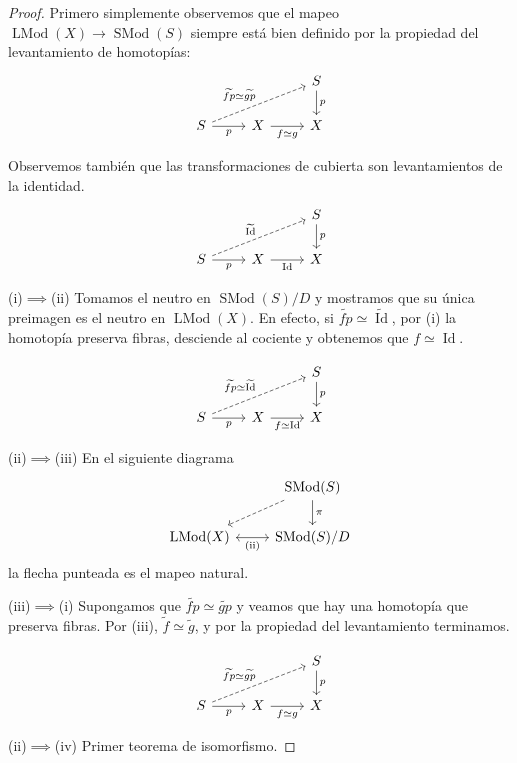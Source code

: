 \documentclass[spanish]{article}
\theoremstyle{definition}
\DeclareMathOperator{\Id}{Id}
\DeclareMathOperator{\SMod}{SMod}
\DeclareMathOperator{\LMod}{LMod}
\begin{document}
\begin{proof}
	Primero simplemente observemos que el mapeo $\LMod(X)\to\SMod(S)$ siempre está bien definido por la propiedad del levantamiento de homotopías:
	\[\begin{tikzcd}[ampersand replacement=\&]
		\&\& S\arrow[d,"p"]\\
		S\arrow[dashed,urr,"\widetilde{fp}\simeq\widetilde{gp}"]\arrow[r,swap,"p"]\& X\arrow[r,swap,"f\simeq g"]\& X
	\end{tikzcd}\]
	
	Observemos también que las transformaciones de cubierta son levantamientos de la identidad.
	\[\begin{tikzcd}[ampersand replacement=\&]
		\&\& S\arrow[d,"p"]\\
		S\arrow[dashed,urr,"\widetilde{\Id}"]\arrow[r,swap,"p"]\& X\arrow[r,swap,"\Id"]\& X
	\end{tikzcd}\]
	
	(i)$\implies$(ii) Tomamos el neutro en $\SMod(S)/D$ y mostramos que su única preimagen es el neutro en $\LMod(X)$. En efecto, si $\widetilde{fp}\simeq\tilde{\Id}$, por (i) la homotopía preserva fibras, desciende al cociente y obtenemos que $f\simeq \Id$.
	
	\[\begin{tikzcd}[ampersand replacement=\&]
		\&\& S\arrow[d,"p"]\\
		S\arrow[dashed,urr,"\widetilde{fp}\simeq\widetilde{\Id}"]\arrow[r,swap,"p"]\& X\arrow[r,swap,"f\simeq\Id"]\& X
	\end{tikzcd}\]
	
	(ii)$\implies$(iii) En el siguiente diagrama
	\[\begin{tikzcd}[ampersand replacement=\&]
		\&\SMod(S)\arrow[d,"\pi"]\arrow[ld,dashed]\\
		\LMod(X)\arrow[r,leftrightarrow,swap,"\text{(ii)}"]\&\SMod(S)/D
	\end{tikzcd}\]
	la flecha punteada es el mapeo natural.
	
	(iii)$\implies$(i)  Supongamos que  $\widetilde{fp}\simeq\widetilde{gp}$ y veamos que hay una homotopía que preserva fibras. Por (iii), $\widetilde{f}\simeq\widetilde{g}$, y por la propiedad del levantamiento terminamos.
	
	\[\begin{tikzcd}[ampersand replacement=\&]
		\&\& S\arrow[d,"p"]\\
		S\arrow[dashed,urr,"\widetilde{fp}\simeq\widetilde{gp}"]\arrow[r,swap,"p"]\& X\arrow[r,swap,"f\simeq g"]\& X
	\end{tikzcd}\]
	
	(ii)$\implies $(iv) Primer teorema de isomorfismo.
\end{proof}
\end{document}
